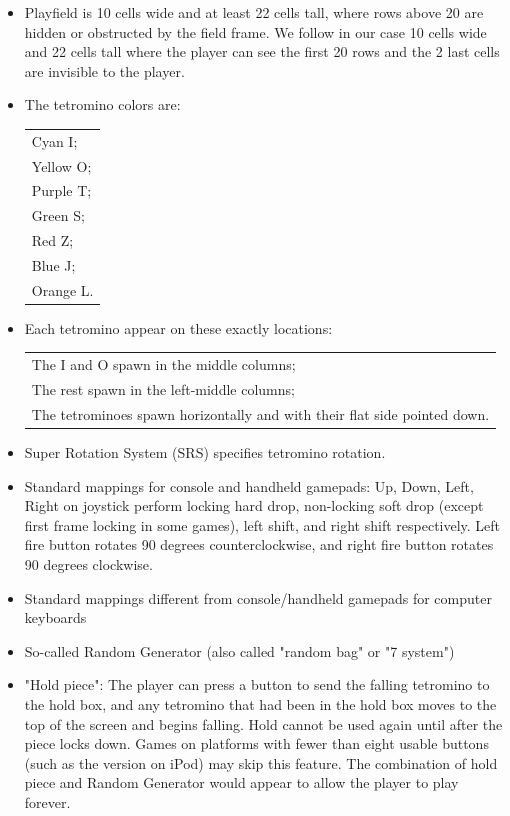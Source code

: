 \documentclass[a4paper]{article}
\begin{document}
\begin{itemize}
	\item Playfield is 10 cells wide and at least 22 cells tall, where rows above 20 are hidden or obstructed by the field frame. We follow in our case 10 cells wide and 22 cells tall where the player can see the first 20 rows and the 2 last cells are invisible to the player. 
	\item The tetromino colors are:
	
	\begin{tabular}{l}
		Cyan I;\\
		Yellow O;\\
		Purple T;\\
		Green S;\\
		Red Z;\\
		Blue J;\\
		Orange L.\\
	\end{tabular}
	
	\item Each tetromino appear on these exactly locations:
	
	\begin{tabular}{l}
		The I and O spawn in the middle columns;\\
		The rest spawn in the left-middle columns;\\
		The tetrominoes spawn horizontally and with their flat side pointed down.\\
	\end{tabular}
	
	\item Super Rotation System (SRS) specifies tetromino rotation.
	
	\item Standard mappings for console and handheld gamepads:
	Up, Down, Left, Right on joystick perform locking hard drop, non-locking soft drop (except first frame locking in some games), left shift, and right shift respectively.
	Left fire button rotates 90 degrees counterclockwise, and right fire button rotates 90 degrees clockwise.
	
	\item Standard mappings different from console/handheld gamepads for computer keyboards
	
	\item So-called Random Generator (also called "random bag" or "7 system")
	
	\item "Hold piece": The player can press a button to send the falling tetromino to the hold box, and any tetromino that had been in the hold box moves to the top of the screen and begins falling. Hold cannot be used again until after the piece locks down. Games on platforms with fewer than eight usable buttons (such as the version on iPod) may skip this feature. The combination of hold piece and Random Generator would appear to allow the player to play forever.
	

\end{itemize}
\end{document}

